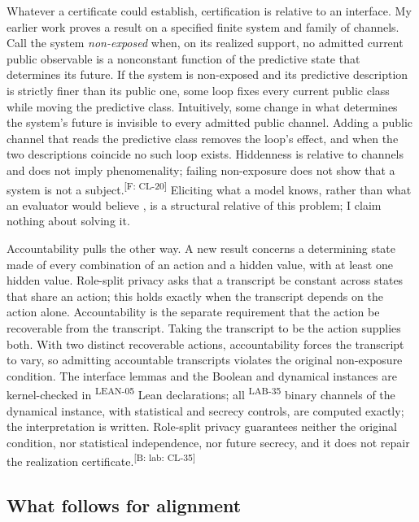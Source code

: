\documentclass[pdflatex,sn-basic]{sn-jnl}%
\newcommand{\slot}[1]{}%
\newcommand{\claim}[2]{\ifannotated\textsuperscript{\textcolor{blue!60!black}{\tiny[#1: #2]}}\fi}
\newcommand{\rec}[1]{\ifannotated\textsuperscript{\textcolor{blue!60!black}{\tiny#1}}\fi}
\newcommand{\Selfcite}[1]{\ifanonymous\citet{#1}\else My earlier work \citep{#1}\fi}
\begin{document}
\slot{6.3}
Whatever a certificate could establish, certification is relative to an interface. \Selfcite{tsiokos2026consciousness} proves a result on a specified finite system and family of channels. Call the system \emph{non-exposed} when, on its realized support, no admitted current public observable is a nonconstant function of the predictive state that determines its future. If the system is non-exposed and its predictive description is strictly finer than its public one, some loop fixes every current public class while moving the predictive class. Intuitively, some change in what determines the system's future is invisible to every admitted public channel. Adding a public channel that reads the predictive class removes the loop's effect, and when the two descriptions coincide no such loop exists. Hiddenness is relative to channels and does not imply phenomenality; failing non-exposure does not show that a system is not a subject.\claim{F}{CL-20} Eliciting what a model knows, rather than what an evaluator would believe \citep{christiano2021elk}, is a structural relative of this problem; I claim nothing about solving it.

Accountability pulls the other way. A new result concerns a determining state made of every combination of an action and a hidden value, with at least one hidden value. Role-split privacy asks that a transcript be constant across states that share an action; this holds exactly when the transcript depends on the action alone. Accountability is the separate requirement that the action be recoverable from the transcript. Taking the transcript to be the action supplies both. With two distinct recoverable actions, accountability forces the transcript to vary, so admitting accountable transcripts violates the original non-exposure condition. The interface lemmas and the Boolean and dynamical instances are kernel-checked in \numLeanRolePrivacy\rec{LEAN-05} Lean declarations; all \numCTwoChannels\rec{LAB-35} binary channels of the dynamical instance, with statistical and secrecy controls, are computed exactly; the interpretation is written. Role-split privacy guarantees neither the original condition, nor statistical independence, nor future secrecy, and it does not repair the realization certificate.\claim{B: lab}{CL-35}

\subsection{What follows for alignment}\label{sec:who-alignment}
\end{document}
